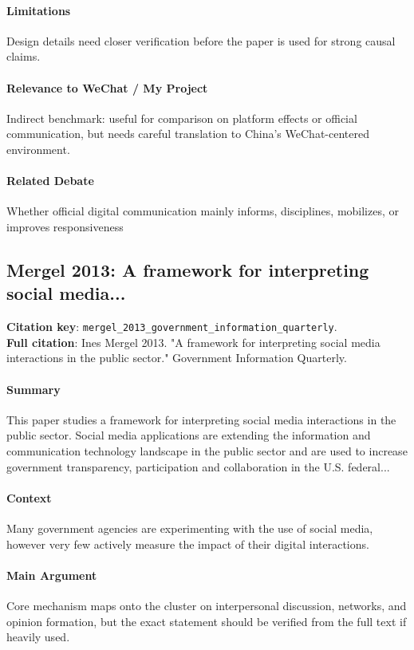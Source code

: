 \documentclass[12pt]{article}
\begin{document}
\paragraph{Limitations} Design details need closer verification before the paper is used for strong causal claims.

\paragraph{Relevance to WeChat / My Project} Indirect benchmark: useful for comparison on platform effects or official communication, but needs careful translation to China's WeChat-centered environment.

\paragraph{Related Debate} Whether official digital communication mainly informs, disciplines, mobilizes, or improves responsiveness


\subsection{Mergel 2013: A framework for interpreting social media...}
\textbf{Citation key}: \texttt{mergel\_2013\_government\_information\_quarterly}.\\
\textbf{Full citation}: Ines Mergel 2013. "A framework for interpreting social media interactions in the public sector." Government Information Quarterly.

\paragraph{Summary} This paper studies a framework for interpreting social media interactions in the public sector. Social media applications are extending the information and communication technology landscape in the public sector and are used to increase government transparency, participation and collaboration in the U.S. federal...

\paragraph{Context} Many government agencies are experimenting with the use of social media, however very few actively measure the impact of their digital interactions.

\paragraph{Main Argument} Core mechanism maps onto the cluster on interpersonal discussion, networks, and opinion formation, but the exact statement should be verified from the full text if heavily used.
\end{document}
